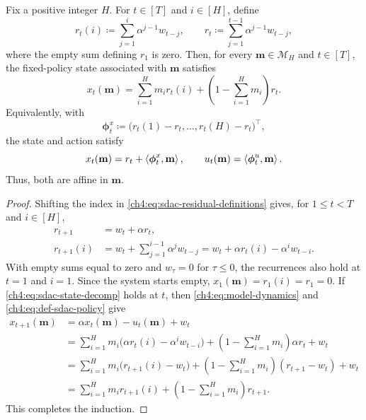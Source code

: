 \begin{Thm:Lemma}
\label{ch4:lem:sdac-state-decomp}
Fix a positive integer $H$.
For $t\in[T]$ and $i\in[H]$, define
\begin{equation}
\label{ch4:eq:sdac-residual-definitions}
r_t(i)
\coloneqq
\sum_{j=1}^{i}\alpha^{j-1}w_{t-j},
\qquad
r_t
\coloneqq
\sum_{j=1}^{t-1}\alpha^{j-1}w_{t-j},
\end{equation}
where the empty sum defining $r_1$ is zero. Then, for every
$\mathbf{m}\in\mathcal{M}_H$ and $t\in[T]$, the fixed-policy state associated
with $\mathbf{m}$ satisfies
\begin{equation}
\label{ch4:eq:sdac-state-decomp}
x_t(\mathbf{m})
=
\sum_{i=1}^H m_i r_t(i)
+\left(1-\sum_{i=1}^H m_i\right)r_t.
\end{equation}
Equivalently, with
\begin{equation}
\label{ch4:eq:def-phi-x}
\boldsymbol{\phi}_t^x
\coloneqq
\bigl(r_t(1)-r_t,\ldots,r_t(H)-r_t\bigr)^\top,
\end{equation}
the state and action satisfy
\begin{equation}
\label{ch4:eq:surr-affine-pair}
x_t(\mathbf{m})=r_t+\left\langle \boldsymbol{\phi}_t^x,\mathbf{m} \right\rangle,
\qquad
u_t(\mathbf{m})=\left\langle \boldsymbol{\phi}_t^u,\mathbf{m} \right\rangle.
\end{equation}
Thus, both are affine in $\mathbf m$.
\end{Thm:Lemma}

\begin{proof}
Shifting the index in \eqref{ch4:eq:sdac-residual-definitions} gives,
for $1\le t<T$ and $i\in[H]$,
\begin{align*}
r_{t+1}&=w_t+\alpha r_t, \\
r_{t+1}(i)
&=w_t+\sum_{j=1}^{i-1}\alpha^j w_{t-j}
=w_t+\alpha r_t(i)-\alpha^i w_{t-i}.
\end{align*}
With empty sums equal to zero and $w_\tau=0$ for $\tau\le0$, the
recurrences also hold at $t=1$ and $i=1$. Since the system starts empty,
$x_1(\mathbf m)=r_1(i)=r_1=0$.
If \eqref{ch4:eq:sdac-state-decomp} holds at $t$, then
\eqref{ch4:eq:model-dynamics} and \eqref{ch4:eq:def-sdac-policy} give
\begin{align*}
x_{t+1}(\mathbf{m})
&=\alpha x_t(\mathbf{m})-u_t(\mathbf{m})+w_t\\
&=\sum_{i=1}^H m_i
\bigl(\alpha r_t(i)-\alpha^i w_{t-i}\bigr)
+\left(1-\sum_{i=1}^H m_i\right)\alpha r_t+w_t\\
&=\sum_{i=1}^H m_i\bigl(r_{t+1}(i)-w_t\bigr)
+\left(1-\sum_{i=1}^H m_i\right)(r_{t+1}-w_t)+w_t\\
&=\sum_{i=1}^H m_i r_{t+1}(i)
+\left(1-\sum_{i=1}^H m_i\right)r_{t+1}.
\end{align*}
This completes the induction.
\end{proof}



